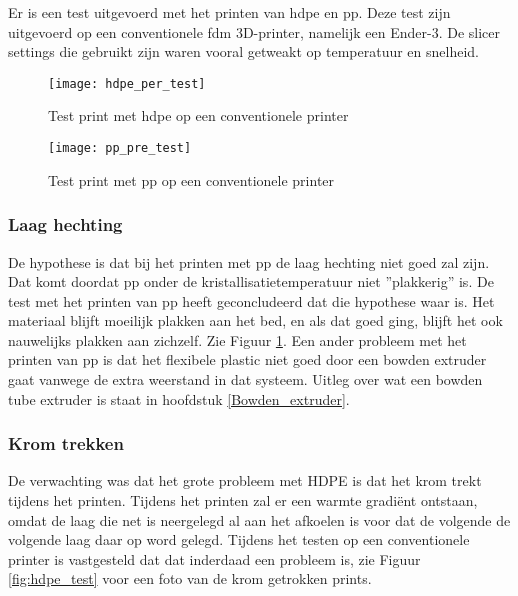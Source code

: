 Er is een test uitgevoerd met het printen van \ac{hdpe} en \ac{pp}.  Deze test
zijn uitgevoerd op een conventionele \ac{fdm} 3D-printer, namelijk een Ender-3.
De slicer settings die gebruikt zijn waren vooral getweakt op temperatuur en
snelheid.

\begin{figure}[h]
    \centering
    \begin{minipage}{0.45\textwidth}
        \centerline{\texttt{[image: hdpe\_per\_test]}}
        \caption{Test print met \ac{hdpe} op een conventionele printer}
        \label{fig:hdpe_test}
    \end{minipage}\hfill
    \begin{minipage}{0.45\textwidth}
        \centerline{\texttt{[image: pp\_pre\_test]}}
        \caption{Test print met \ac{pp} op een conventionele printer}
        \label{fig:pp_test}
    \end{minipage}
\end{figure}

\subsubsection{Laag hechting}

De hypothese is dat bij het printen met \ac{pp} de laag hechting niet goed zal
zijn. Dat komt doordat \ac{pp} onder de kristallisatietemperatuur niet
''plakkerig'' is. De test met het printen van \ac{pp} heeft geconcludeerd dat
die hypothese waar is. Het materiaal blijft moeilijk plakken aan het bed, en als
dat goed ging, blijft het ook nauwelijks plakken aan zichzelf. Zie Figuur
\ref{fig:pp_test}. Een ander probleem met het printen van \ac{pp} is dat het
flexibele plastic niet goed door een bowden extruder gaat vanwege de extra
weerstand in dat systeem. Uitleg over wat een bowden tube extruder is staat in
hoofdstuk \ref{Bowden_extruder}. 

\subsubsection{Krom trekken}

De verwachting was dat het grote probleem met HDPE is dat het krom trekt tijdens
het printen. Tijdens het printen zal er een warmte gradiënt ontstaan, omdat de
laag die net is neergelegd al aan het afkoelen is voor dat de volgende de
volgende laag daar op word gelegd. Tijdens het testen op een conventionele
printer is vastgesteld dat dat inderdaad een probleem is, zie Figuur
\ref{fig:hdpe_test} voor een foto van de krom getrokken prints.

